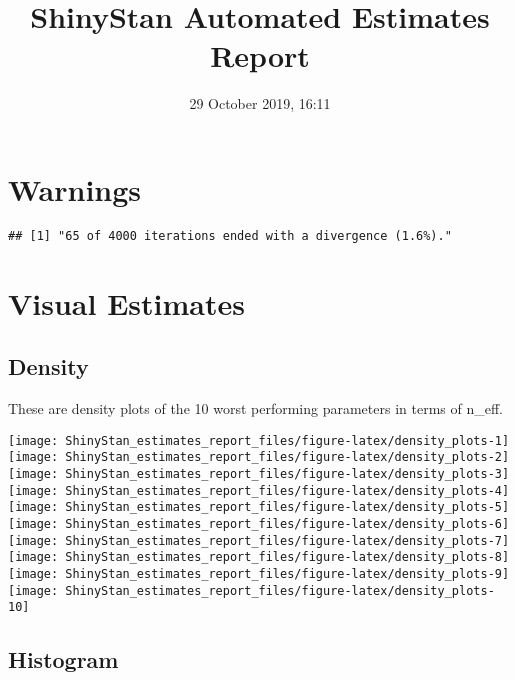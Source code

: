 \documentclass[11pt,]{article}
\title{ShinyStan Automated Estimates Report}
\author{}
\date{29 October 2019, 16:11}
\begin{document}
\maketitle

{
\setcounter{tocdepth}{2}
\tableofcontents
}
\hypertarget{warnings}{%
\section{Warnings}\label{warnings}}

\begin{verbatim}
## [1] "65 of 4000 iterations ended with a divergence (1.6%)."
\end{verbatim}

\newpage

\hypertarget{visual-estimates}{%
\section{Visual Estimates}\label{visual-estimates}}

\hypertarget{density}{%
\subsection{Density}\label{density}}

These are density plots of the 10 worst performing parameters in terms
of n\_eff.

\texttt{[image: ShinyStan\_estimates\_report\_files/figure-latex/density\_plots-1]}
\texttt{[image: ShinyStan\_estimates\_report\_files/figure-latex/density\_plots-2]}
\texttt{[image: ShinyStan\_estimates\_report\_files/figure-latex/density\_plots-3]}
\texttt{[image: ShinyStan\_estimates\_report\_files/figure-latex/density\_plots-4]}
\texttt{[image: ShinyStan\_estimates\_report\_files/figure-latex/density\_plots-5]}
\texttt{[image: ShinyStan\_estimates\_report\_files/figure-latex/density\_plots-6]}
\texttt{[image: ShinyStan\_estimates\_report\_files/figure-latex/density\_plots-7]}
\texttt{[image: ShinyStan\_estimates\_report\_files/figure-latex/density\_plots-8]}
\texttt{[image: ShinyStan\_estimates\_report\_files/figure-latex/density\_plots-9]}
\texttt{[image: ShinyStan\_estimates\_report\_files/figure-latex/density\_plots-10]}

\newpage

\hypertarget{histogram}{%
\subsection{Histogram}\label{histogram}}
\end{document}
